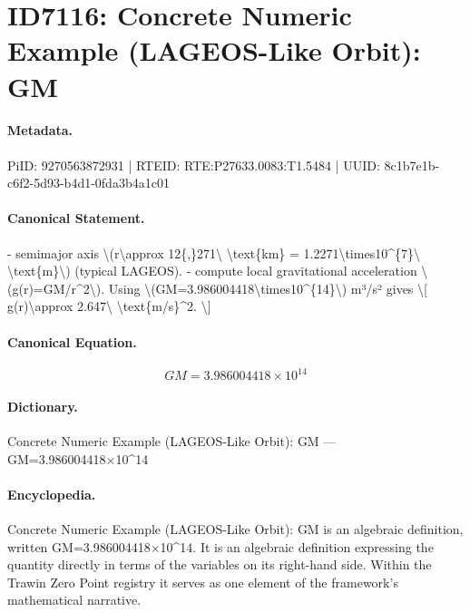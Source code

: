\section*{ID7116: Concrete Numeric Example (LAGEOS-Like Orbit): GM}
\paragraph{Metadata.}
PiID: 9270563872931 | RTEID: RTE:P27633.0083:T1.5484 | UUID: 8c1b7e1b-c6f2-5d93-b4d1-0fda3b4a1c01

\paragraph{Canonical Statement.}
- semimajor axis \textbackslash{}(r\textbackslash{}approx 12\{,\}271\textbackslash{} \textbackslash{}text\{km\} = 1.2271\textbackslash{}times10\textasciicircum{}\{7\}\textbackslash{} \textbackslash{}text\{m\}\textbackslash{}) (typical LAGEOS). - compute local gravitational acceleration \textbackslash{}(g(r)=GM/r\textasciicircum{}2\textbackslash{}). Using \textbackslash{}(GM=3.986004418\textbackslash{}times10\textasciicircum{}\{14\}\textbackslash{}) m³/s² gives \textbackslash{}[ g(r)\textbackslash{}approx 2.647\textbackslash{} \textbackslash{}text\{m/s\}\textasciicircum{}2. \textbackslash{}]

\paragraph{Canonical Equation.}
\[
GM=3.986004418\times10^{14}
\]

\paragraph{Dictionary.}
Concrete Numeric Example (LAGEOS-Like Orbit): GM — GM=3.986004418×10\textasciicircum{}14

\paragraph{Encyclopedia.}
Concrete Numeric Example (LAGEOS-Like Orbit): GM is an algebraic definition, written GM=3.986004418×10\textasciicircum{}14. It is an algebraic definition expressing the quantity directly in terms of the variables on its right-hand side. Within the Trawin Zero Point registry it serves as one element of the framework's mathematical narrative.
